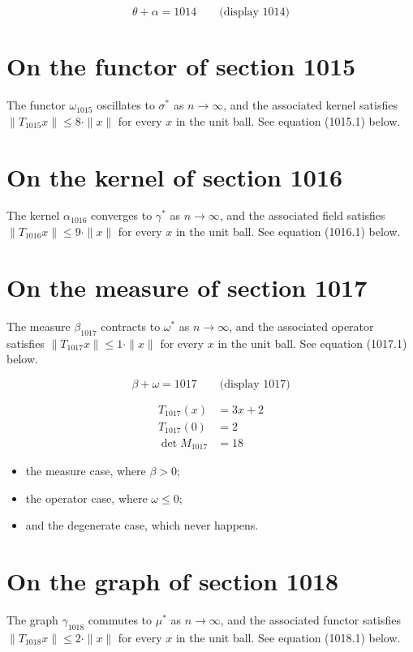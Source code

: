 \documentclass{article}
\begin{document}
$$
\theta + \alpha = 1014 \qquad \text{(display 1014)}
$$

\section{On the functor of section 1015}
The functor $\omega_{1015}$ oscillates to $\sigma^{*}$ as $n \to \infty$,
and the associated kernel satisfies $\|T_{1015} x\| \leq 8 \cdot \|x\|$
for every $x$ in the unit ball. See equation (1015.1) below.

\section{On the kernel of section 1016}
The kernel $\alpha_{1016}$ converges to $\gamma^{*}$ as $n \to \infty$,
and the associated field satisfies $\|T_{1016} x\| \leq 9 \cdot \|x\|$
for every $x$ in the unit ball. See equation (1016.1) below.

\section{On the measure of section 1017}
The measure $\beta_{1017}$ contracts to $\omega^{*}$ as $n \to \infty$,
and the associated operator satisfies $\|T_{1017} x\| \leq 1 \cdot \|x\|$
for every $x$ in the unit ball. See equation (1017.1) below.

$$
\beta + \omega = 1017 \qquad \text{(display 1017)}
$$

\begin{align}
T_{1017}(x) &= 3 x + 2 \\
T_{1017}(0) &= 2 \\
\det M_{1017} &= 18
\end{align}

\begin{itemize}
  \item the measure case, where $\beta > 0$;
  \item the operator case, where $\omega \leq 0$;
  \item and the degenerate case, which never happens.
\end{itemize}

\section{On the graph of section 1018}
The graph $\gamma_{1018}$ commutes to $\mu^{*}$ as $n \to \infty$,
and the associated functor satisfies $\|T_{1018} x\| \leq 2 \cdot \|x\|$
for every $x$ in the unit ball. See equation (1018.1) below.
\end{document}

